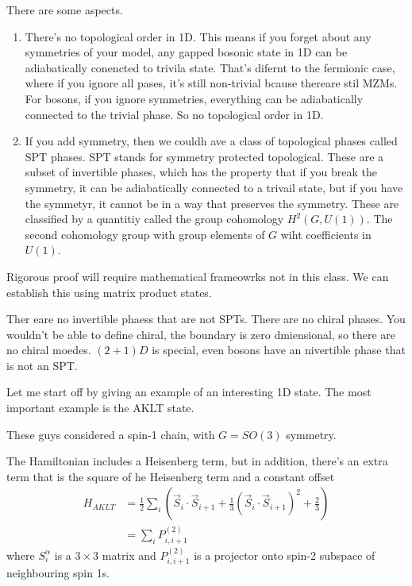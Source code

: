 There are some aspects.
\begin{enumerate}
    \item There's no topological order in 1D.
        This means if you forget about any symmetries of your model,
        any gapped bosonic state in 1D can be adiabatically conencted to trivila
        state.
        That's difernt to the fermionic case,
        where if you ignore all pases,
        it's still non-trivial bcause thereare stil MZMs.
        For bosons,
        if you ignore symmetries,
        everything can be adiabatically connected to the trivial phase.
        So no topological order in 1D.
    \item If you add symmetry,
        then we couldh ave a class of topological phases called SPT phases.
        SPT stands for symmetry protected topological.
        These are a subset of invertible phases,
        which has the property that if you break the symmetry,
        it can be adiabatically connected to a trivail state,
        but if you have the symmetyr,
        it cannot be in a way that preserves the symmetry.
        These are classified by a quantitiy called the group cohomology
        $H^2(G, U(1))$.
        The second cohomology group with group elements of $G$ wiht coefficients
        in $U(1)$.
\end{enumerate}
Rigorous proof will require mathematical frameowrks not in this class.
We can establish this using matrix product states.

Ther eare no invertible phaess that are not SPTs.
There are no chiral phases.
You wouldn't be able to define chiral,
the boundary is zero dmiensional,
so there are no chiral moedes.
$(2+1)D$ is special,
even bosons have an nivertible phase that is not an SPT.

Let me start off by giving an example of an interesting 1D state.
The most important example is the AKLT state.

These guys considered a spin-1 chain,
with $G=SO(3)$ symmetry.

The Hamiltonian includes a Heisenberg term,
but in addition,
there's an extra term that is the square of he Heisenberg term
and a constant offset
\begin{align}
    H_{AKLT} &=
    \frac{1}{2} \sum_{i} \left( 
    \vec{S}_i\cdot \vec{S}_{i+1}
    + \frac{1}{3} \left( \vec{S}_i\cdot\vec{S}_{i+1} \right)^2
    + \frac{2}{3}
    \right)\\
    &= \sum_i P_{i,i+1}^{(2)}
\end{align}
where $S_i^{\alpha}$ is a $3\times 3$ matrix
and $P_{i,i+1}^{(2)}$ is a projector onto spin-2 subspace of neighbouring spin
1s.

